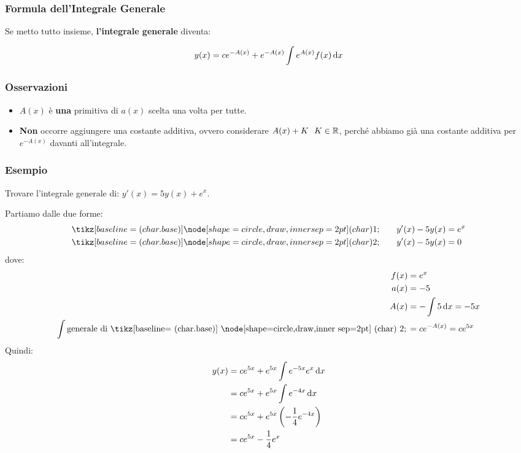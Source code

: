 \pagebreak
\subsubsection{Formula dell'Integrale Generale}

Se metto tutto insieme, \textbf{l'integrale generale} diventa:

\[
    y(x) = c e ^{-A(x)} + e ^{-A(x)} \int e^{A(x)} f(x) \mathop{}\!\mathrm{d} x
\]

\subsubsection*{Osservazioni}

\begin{itemize}
    \item \(A(x)\) è \textbf{una} primitiva di \(a(x)\) scelta una volta per tutte.
    \item \textbf{Non} occorre aggiungere una costante additiva, ovvero considerare \(A(x) + K\ \ K \in \mathbb{R} \), perché abbiamo già una costante additiva per \(e^{-A(x)}\) davanti all'integrale.
\end{itemize}

\subsubsection*{Esempio}

Trovare l'integrale generale di: \(y'(x) = 5y(x) + e^x\).

Partiamo dalle due forme:
\begin{align*}
    \circled{1} \qquad y'(x) - 5y(x) & = e^x \\
    \circled{2} \qquad y'(x) - 5y(x) & = 0
\end{align*}
dove:
\begin{align*}
    f(x)                                  & = e^x                    \\
    a(x)                                  & = -5                     \\
    A(x)                                  & = - \int 5 \diff x = -5x \\
    \int \text{generale di \circled{2}}\, & = ce^{-A(x)} = ce^{5x}
\end{align*}
Quindi:
\begin{align*}
    y(x) & = c e ^{5x} + e ^{5x} \int e ^{-5x} e^x \mathop{}\!\mathrm{d} x             \\
         & = c e ^{5x} + e ^{5x} \int e ^{-4x} \mathop{}\!\mathrm{d} x                 \\
         & = c e ^{5x} + e ^{5x} \left( - \frac{1}{4} e ^{-4x} \right) \\
         & = c e ^{5x} - \frac{1}{4} e ^{x}
\end{align*}

